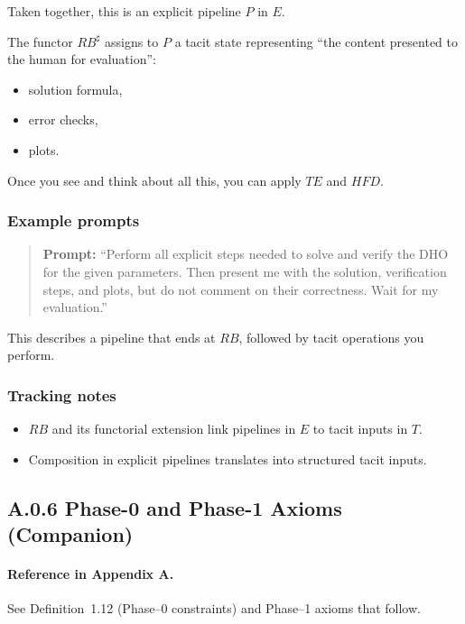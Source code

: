 Taken together, this is an explicit pipeline $P$ in $E$.

The functor $RB^\sharp$ assigns to $P$ a tacit state representing ``the content presented to the human
for evaluation'':

\begin{itemize}
 \item solution formula,
 \item error checks,
 \item plots.
\end{itemize}

Once you see and think about all this, you can apply $TE$ and $HFD$.

\subsubsection*{Example prompts}

\begin{quote}
\textbf{Prompt:} 
``Perform all explicit steps needed to solve and verify the DHO for the given parameters. 
Then present me with the solution, verification steps, and plots, but do not comment on their correctness. 
Wait for my evaluation.'' 
\end{quote}

This describes a pipeline that ends at $RB$, followed by tacit operations you perform.

\subsubsection*{Tracking notes}

\begin{itemize}
 \item $RB$ and its functorial extension link pipelines in $E$ to tacit inputs in $T$.
 \item Composition in explicit pipelines translates into structured tacit inputs.
\end{itemize}

\newpage

\subsection{A.0.6 Phase-0 and Phase-1 Axioms (Companion)}

\paragraph{Reference in Appendix A.}
See Definition~1.12 (Phase--0 constraints) and Phase--1 axioms that follow.

